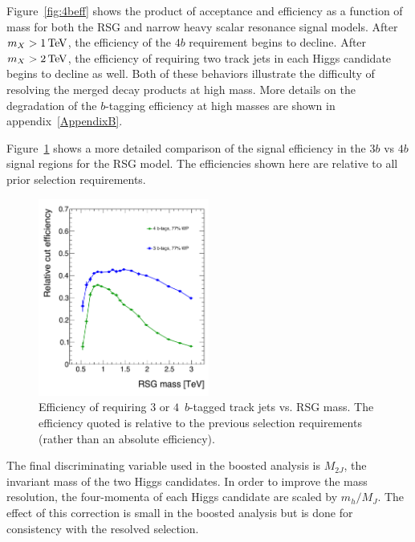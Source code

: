 Figure~\ref{fig:4beff} shows the product of acceptance and efficiency as a function of mass for both the RSG and narrow heavy scalar resonance signal models. After $m_{X} > 1 \TeV$, the efficiency of the $4b$ requirement begins to decline. After $m_{X} > 2 \TeV$, the efficiency of requiring two track jets in each Higgs candidate begins to decline as well. Both of these behaviors illustrate the difficulty of resolving the merged decay products at high mass. More details on the degradation of the $b$-tagging efficiency at high masses are shown in appendix~\ref{AppendixB}. 

Figure~\ref{fig:3bvs4b} shows a more detailed comparison of the signal efficiency in the $3b$ vs $4b$ signal regions for the RSG model. The efficiencies shown here are relative to all prior selection requirements. 

\begin{figure}[h!]
  \centering
  \captionsetup{justification=centering}

  \includegraphics[width=0.5\textwidth]{figures/3bvs4b_eff}
  \caption{Efficiency of requiring $3$ or $4\,$ $b$-tagged track jets vs. RSG mass. The efficiency quoted is relative to the previous selection requirements (rather than an absolute efficiency). }
  \label{fig:3bvs4b}
\end{figure}

The final discriminating variable used in the boosted analysis is $M_{2J}$, the invariant mass of the two Higgs candidates. In order to improve the mass resolution, the four-momenta of each Higgs candidate are scaled by $m_{h}/M_{J}$. The effect of this correction is small in the boosted analysis but is done for consistency with the resolved selection. 


